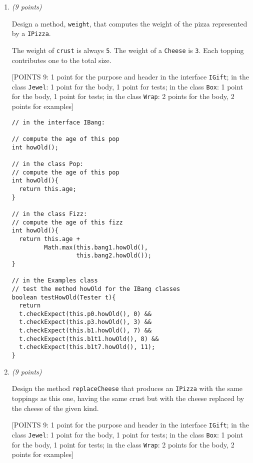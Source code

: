 \documentclass[11pt]{article}
\newcommand\code[1]{\texttt{#1}}
\newcounter{Pctr}
\newenvironment{problem}{\stepcounter{Pctr}%
\begin{description}
\item[\noindent{\bf Problem} \arabic{Pctr}] 
\end{description}}{\relax}
\begin{document}
\begin{problem}
\begin{enumerate}
\newpage
\item {\em{(9 points)}}

Design a method, \code{weight}, that computes the weight of the pizza
represented by a \code{IPizza}.

      The weight of \code{crust} is always \code{5}.  The weight 
      of a \code{Cheese} is \code{3}. Each
      topping contributes one to the total size.


\begsol{\vspace{0.5in}}
[POINTS 9: 1 point for the purpose and header in the interface
\texttt{IGift}; in the class \texttt{Jewel}: 1 point for the body, 1
point for tests; in the class \texttt{Box}: 1 point for the body, 1
point for tests; in the class \texttt{Wrap}: 2 
points for the body, 2 points for examples]

\begin{verbatim}
// in the interface IBang:

// compute the age of this pop
int howOld();

// in the class Pop:
// compute the age of this pop
int howOld(){
  return this.age;
}

// in the class Fizz:
// compute the age of this fizz
int howOld(){
  return this.age + 
         Math.max(this.bang1.howOld(), 
                  this.bang2.howOld());
}

// in the Examples class
// test the method howOld for the IBang classes
boolean testHowOld(Tester t){
  return
  t.checkExpect(this.p0.howOld(), 0) &&
  t.checkExpect(this.p3.howOld(), 3) &&
  t.checkExpect(this.b1.howOld(), 7) &&
  t.checkExpect(this.b1t1.howOld(), 8) &&
  t.checkExpect(this.b1t7.howOld(), 11);
}	
\end{verbatim}
\endsol

\newpage
\item {\em{(9 points)}}

Design the method \code{replaceCheese} that produces an
    \code{IPizza} with the same toppings as this one,
    having the same crust but with the cheese replaced by the
    cheese of the given kind.


\begsol{\vspace{0.5in}}
[POINTS 9: 1 point for the purpose and header in the interface
\texttt{IGift}; in the class \texttt{Jewel}: 1 point for the body, 1
point for tests; in the class \texttt{Box}: 1 point for the body, 1
point for tests; in the class \texttt{Wrap}: 2 
points for the body, 2 points for examples]


\end{enumerate}
\end{problem}
\end{document}
